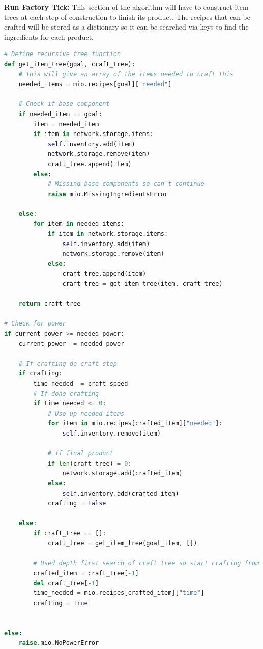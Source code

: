 \documentclass[12pt]{article}
\begin{document}
\textbf{Run Factory Tick:}\newline
This section of the algorithm will have to construct item trees at each step of construction to finish its product. The recipes that can be crafted will be stored as a dictionary so it can be searched via keys to find the ingredients for each product.
\begin{lstlisting}[language=Python, caption=Run Factory Tick]
# Define recursive tree function
def get_item_tree(goal, craft_tree):
    # This will give an array of the items needed to craft this
    needed_items = mio.recipes[goal]["needed"]
    
    # Check if base component
    if needed_item == goal:
        item = needed_item
        if item in network.storage.items:
            self.inventory.add(item)
            network.storage.remove(item)
            craft_tree.append(item)
        else:
            # Missing base components so can't continue
            raise mio.MissingIngredientsError
    
    else:
        for item in needed_items:
            if item in network.storage.items:
                self.inventory.add(item)
                network.storage.remove(item)
            else:
                craft_tree.append(item)
                craft_tree = get_item_tree(item, craft_tree)
    
    return craft_tree

# Check for power
if current_power >= needed_power:
    current_power -= needed_power
    
    # If crafting do craft step
    if crafting:
        time_needed -= craft_speed
        # If done crafting
        if time_needed <= 0:
            # Use up needed items
            for item in mio.recipes[crafted_item]["needed"]:
                self.inventory.remove(item)
                
            # If final product
            if len(craft_tree) = 0:
                network.storage.add(crafted_item)
            else:
                self.inventory.add(crafted_item)
            crafting = False
            
    else:
        if craft_tree == []:
            craft_tree = get_item_tree(goal_item, [])
            
        # Used depth first search of craft tree so start crafting from base of tree.
        crafted_item = craft_tree[-1] 
        del craft_tree[-1]
        time_needed = mio.recipes[crafted_item]["time"]
        crafting = True
            
        
else:
    raise.mio.NoPowerError
\end{lstlisting}
\end{document}

